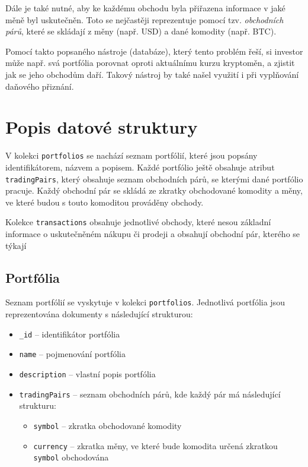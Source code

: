 \documentclass[12pt, a4paper]{article}
\let\oldsection\section
\renewcommand\section{\clearpage\oldsection}
\begin{document}
Dále je také nutné, aby ke každému obchodu byla přiřazena informace v jaké měně byl uskutečněn. Toto se nejčastěji reprezentuje pomocí tzv. \textit{obchodních párů}, které se skládají z měny (např. USD) a dané komodity (např. BTC).

Pomocí takto popsaného nástroje (databáze), který tento problém řeší, si investor může např. svá portfólia porovnat oproti aktuálnímu kurzu kryptoměn, a zjistit jak se jeho obchodům daří. Takový nástroj by také našel využití i při vyplňování daňového přiznání.

\section{Popis datové struktury}

V kolekci \texttt{portfolios} se nachází seznam portfólií, které jsou popsány identifikátorem, názvem a popisem. Každé portfólio ještě obsahuje atribut \texttt{tradingPairs}, který obsahuje seznam obchodních párů, se kterými dané portfólio pracuje. Každý obchodní pár se skládá ze zkratky obchodované komodity a měny, ve které budou s touto komoditou prováděny obchody. 

Kolekce \texttt{transactions} obsahuje jednotlivé obchody, které nesou základní informace o uskutečněném nákupu či prodeji a obsahují obchodní pár, kterého se týkají


\subsection{Portfólia}
Seznam portfólií se vyskytuje v kolekci \texttt{portfolios}. Jednotlivá portfólia jsou reprezentována dokumenty s následující strukturou:
\begin{itemize}
    \item \texttt{\_id} -- identifikátor portfólia
    \item \texttt{name} -- pojmenování portfólia
    \item \texttt{description} -- vlastní popis portfólia
    \item \texttt{tradingPairs} -- seznam obchodních párů, kde každý pár má následující strukturu:
        \begin{itemize}
            \item \texttt{symbol} -- zkratka obchodované komodity
            \item \texttt{currency} -- zkratka měny, ve které bude komodita určená zkratkou \texttt{symbol} obchodována
        \end{itemize}
\end{itemize}
\end{document}
